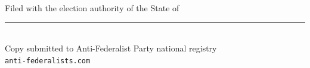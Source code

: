 \documentclass[11pt, letterpaper]{article}
\begin{document}
\newpage


\vspace{2.5cm}




\vspace{2cm}

\begin{center}
  {\small\color{afp-gray}\sffamily
    Filed with the election authority of the State of \rule{4cm}{0.4pt}\\[0.5em]
    Copy submitted to Anti-Federalist Party national registry\\[0.25em]
    \texttt{anti-federalists.com}
  }
\end{center}
\end{document}
